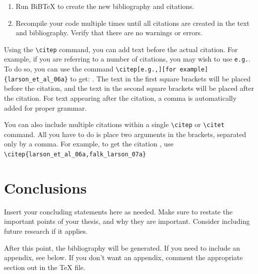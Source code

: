 \documentclass[master]{UWMThesis}
\begin{document}
\begin{enumerate}
For example, to cite the BiBTeX entry described above, use the command
\verb=\citep{larson_et_al_06a}= to get the reference \citep{larson_et_al_06a} with parentheses.  Alternatively, use \verb=\citet{larson_et_al_06a}= to get the reference of \citet{larson_et_al_06a} with parentheses only around the year.

\item Run BiBTeX to create the new bibliography and citations.

\item Recompile your code multiple times until all citations are created in the text and bibliography.  Verify that there are no warnings or errors.

\end{enumerate}

Using the \verb=\citep= command, you can add text before the actual citation.  For example, if you are referring to a number of citations, you may wish to use \verb=e.g.=.  To do so, you can use the command \verb=\citep[e.g.,][for example]{larson_et_al_06a}= to get: \citep[e.g.,][for example]{larson_et_al_06a}.  The text in the first square brackets will be placed before the citation, and the text in the second square brackets will be placed after the citation.  For text appearing after the citation, a comma is automatically added for proper grammar.

You can also include multiple citations within a single \verb=\citep= or \verb=\citet= command. All you have to do is place two arguments in the brackets, separated only by a comma.  For example, to get the citation \citep{larson_et_al_06a,falk_larson_07a}, use \verb=\citep{larson_et_al_06a,falk_larson_07a}=




\chapter{Conclusions}

Insert your concluding statements here as needed.  Make sure to restate the important points of your thesis, and why they are important.  Consider including future research if it applies.

After this point, the bibliography will be generated.  If you need to include an appendix, see below.  If you don't want an appendix, comment the appropriate section out in the TeX file.

\end{document}
